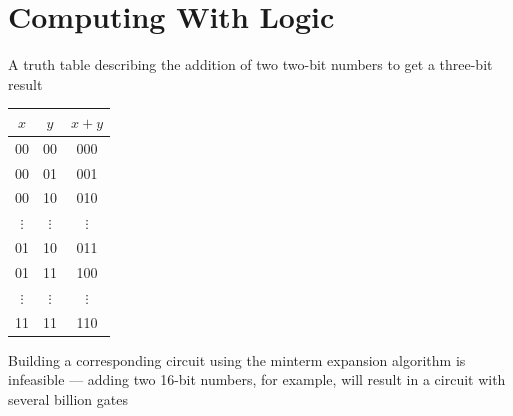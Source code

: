 \documentclass[8pt,a4paper,compress]{beamer}
\begin{document}
\section{Computing With Logic}
\begin{frame}[fragile]
\pause

A truth table describing the addition of two two-bit numbers to get a three-bit result
\begin{center}
\begin{tabular}{cc|c}
$x$ & $y$ & $x +y$ \\ \hline
00 & 00 & 000 \\
00 & 01 & 001 \\
00 & 10 & 010 \\
$\vdots$ & $\vdots$ & $\vdots$ \\
01 & 10 & 011 \\
01 & 11 & 100 \\
$\vdots$ & $\vdots$ & $\vdots$ \\
11 & 11 & 110
\end{tabular}
\end{center}

\pause
\bigskip

Building a corresponding circuit using the minterm expansion algorithm is infeasible --- adding two 16-bit numbers, for example, will result in a circuit with several billion gates
\end{frame}
\end{document}
